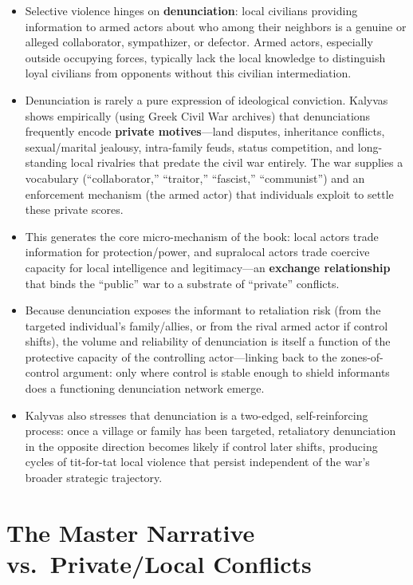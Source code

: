 \documentclass[12pt]{article}
\begin{document}
\begin{itemize}[leftmargin=*, itemsep=4pt]
    \item Selective violence hinges on \textbf{denunciation}: local civilians providing information to armed actors about who among their neighbors is a genuine or alleged collaborator, sympathizer, or defector. Armed actors, especially outside occupying forces, typically lack the local knowledge to distinguish loyal civilians from opponents without this civilian intermediation.
    \item Denunciation is rarely a pure expression of ideological conviction. Kalyvas shows empirically (using Greek Civil War archives) that denunciations frequently encode \textbf{private motives}---land disputes, inheritance conflicts, sexual/marital jealousy, intra-family feuds, status competition, and long-standing local rivalries that predate the civil war entirely. The war supplies a vocabulary (``collaborator,'' ``traitor,'' ``fascist,'' ``communist'') and an enforcement mechanism (the armed actor) that individuals exploit to settle these private scores.
    \item This generates the core micro-mechanism of the book: local actors trade information for protection/power, and supralocal actors trade coercive capacity for local intelligence and legitimacy---an \textbf{exchange relationship} that binds the ``public'' war to a substrate of ``private'' conflicts.
    \item Because denunciation exposes the informant to retaliation risk (from the targeted individual's family/allies, or from the rival armed actor if control shifts), the volume and reliability of denunciation is itself a function of the protective capacity of the controlling actor---linking back to the zones-of-control argument: only where control is stable enough to shield informants does a functioning denunciation network emerge.
    \item Kalyvas also stresses that denunciation is a two-edged, self-reinforcing process: once a village or family has been targeted, retaliatory denunciation in the opposite direction becomes likely if control later shifts, producing cycles of tit-for-tat local violence that persist independent of the war's broader strategic trajectory.
\end{itemize}

\section{The Master Narrative vs.\ Private/Local Conflicts}
\end{document}
